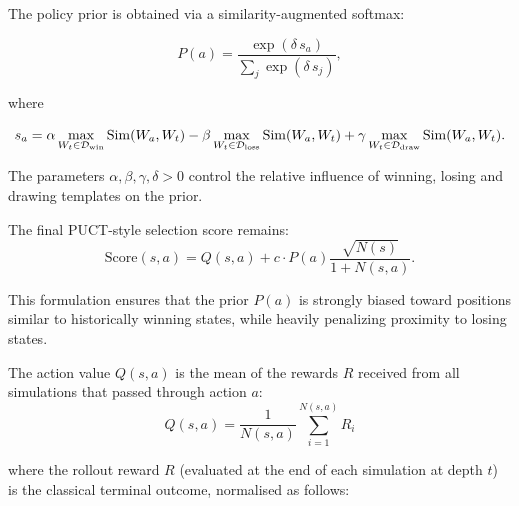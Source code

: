 \documentclass[11pt,a4paper]{article}
\theoremstyle{plain}
\theoremstyle{definition}
\begin{document}
The policy prior is obtained via a similarity-augmented softmax:

\vspace{0.5em}

\begin{equation}
P(a)
=
\frac{\exp(\delta\, s_a)}{\sum_j\exp(\delta\, s_j)},
\end{equation}

\vspace{0.5em}

where

\vspace{0.5em}

\begin{equation}
s_a
=
\alpha\max_{W_t\in\mathcal{D}_{\rm win}}\operatorname{Sim}(W_a,W_t)
-
\beta\max_{W_t\in\mathcal{D}_{\rm loss}}\operatorname{Sim}(W_a,W_t)
+
\gamma\max_{W_t\in\mathcal{D}_{\rm draw}}\operatorname{Sim}(W_a,W_t).
\end{equation}

\vspace{0.5em}

The parameters \(\alpha,\beta,\gamma,\delta>0\) control the relative influence of winning, losing and drawing templates on the prior.

\vspace{0.5em}

The final PUCT-style selection score remains:
\begin{equation}
\text{Score}(s,a) = Q(s,a) + c \cdot P(a) \frac{\sqrt{N(s)}}{1+N(s,a)}.
\end{equation}

\vspace{0.5em}

This formulation ensures that the prior $P(a)$ is strongly biased toward positions similar to historically winning states, while heavily penalizing proximity to losing states. 

\vspace{0.5em}

The action value $Q(s,a)$ is the mean of the rewards $R$ received from all simulations that passed through action $a$:
\[
Q(s,a) = \frac{1}{N(s,a)} \sum_{i=1}^{N(s,a)} R_i
\]

\vspace{0.5em}

where the rollout reward \(R\) (evaluated at the end of each simulation at depth \(t\)) is the classical terminal outcome, normalised as follows:

\vspace{0.5em}
\end{document}
